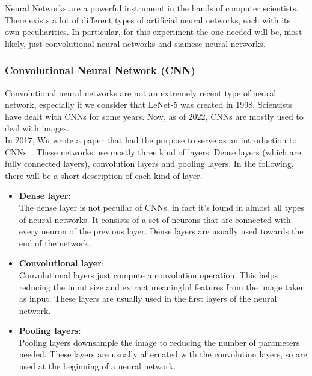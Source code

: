 \documentclass[conference]{IEEEtran}
\begin{document}
			Neural Networks are a powerful instrument in the hands of computer scientists. There exists a lot of different types of artificial neural networks, each with its own peculiarities. In particular, for this 
			experiment the one needed will be, most likely, just convolutional neural networks and siamese neural networks. 
		
			\subsubsection{Convolutional Neural Network (CNN)}
			
				Convolutional neural networks are not an extremely recent type of neural network, especially if we consider that LeNet-5 was created in 1998. Scientists have dealt with CNNs for some years. Now, as of 2022, 
				CNNs are mostly used to deal with images.\\
				In 2017, Wu wrote a paper that had the purpose to serve as an introduction to CNNs~\cite{wu2017introduction}. These networks use mostly three kind of layers: Dense layers (which are fully connected layers), 
				convolution layers and pooling layers. In the following, there will be a short description of each kind of layer. 
				\begin{itemize}
					
					\item \textbf{Dense layer}:\\
						The dense layer is not peculiar of CNNs, in fact it's found in almost all types of neural networks. It consists of a set of neurons that are connected with every neuron of the previous 
						layer. Dense layers are usually used towards the end of the network.
					
					\item \textbf{Convolutional layer}:\\
						Convolutional layers just compute a convolution operation. This helps reducing the input size and extract meaningful features from the image taken as input. These layers are usually used 
						in the first layers of the neural network.
					
					\item \textbf{Pooling layers}:\\
						Pooling layers downsample the image to reducing the number of parameters needed. These layers are usually alternated with the convolution layers, so are used at the beginning of a neural network.
						
				\end{itemize}
				
\end{document}
